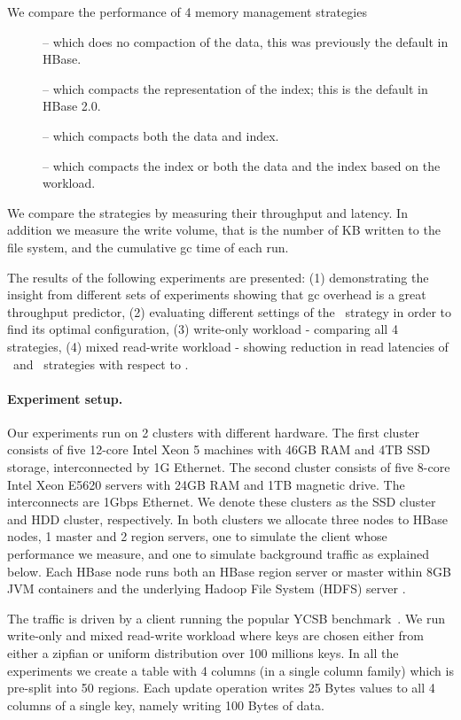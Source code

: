 We compare the performance of 4 memory management strategies 
\begin{description}
\item[\none] -- which does no compaction of the data, this was previously the default in HBase.
\item[\basic] -- which compacts the representation of the index; this is the default in HBase 2.0.
\item[\eager] -- which compacts both the data and index.
\item[\magic] -- which compacts the index or both the data and the index based on the workload.
\end{description}

We compare the strategies by measuring their throughput and latency. In addition we measure the write volume, that is the number of KB written to the file system, and the cumulative gc time of each run.

The results of the following experiments are presented:
(1) demonstrating the insight from different sets of experiments showing that gc overhead is a great throughput predictor,
(2) evaluating different settings of the \basic\ strategy in order to find its optimal configuration,
(3) write-only workload - comparing all 4 strategies,
(4) mixed read-write workload - showing reduction in read latencies of \basic\ and \magic\ strategies with respect to \none.

\paragraph{Experiment setup.}

Our experiments run on 2 clusters with different hardware. 
The first cluster consists of five 12-core Intel Xeon 5 machines with 46GB RAM and 4TB 
SSD storage, interconnected by 1G Ethernet. 
The second cluster consists of five 8-core 
Intel Xeon E5620 servers with 24GB RAM and 1TB magnetic drive. The interconnects  are 1Gbps Ethernet. 
We denote these clusters as the SSD cluster and HDD cluster, respectively.
In both clusters we allocate three nodes to HBase nodes, 1 master and 2 region servers, one to simulate the client whose performance we measure, and one to simulate background traffic
as explained below. Each HBase node runs both an HBase region server or master within 8GB JVM containers and the underlying 
Hadoop File System (HDFS) server . 

The traffic is driven by a client running the popular YCSB benchmark~\cite{Cooper}. 
We run write-only and mixed read-write workload where keys are chosen either from either a zipfian or uniform distribution over 100 millions keys.
In all the experiments we create a table with 4 columns (in a single column family) which is pre-split into 50 regions. 
Each update operation writes 25 Bytes values to all 4 columns of a single key, namely writing 100 Bytes of data.


